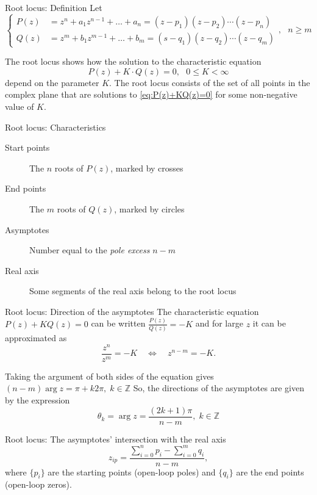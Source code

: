 \documentclass[presentation,aspectratio=169]{beamer}
\begin{document}
\begin{frame}[label={sec:orgdddade7}]{Root locus: Definition}
Let
\[\begin{cases} P(z)&=z^n+a_1z^{n-1}+\dots+a_n = (z-p_1)(z-p_2)\cdots(z-p_n)\\ 
Q(z)&=z^m+b_1 z^{m-1}+\dots+b_m=(s-q_1)(z-q_2)\cdots(z-q_m) \end{cases},\ \ \ n\ge m \]

\pause
The root locus shows how the \alert{solution} to the characteristic equation
\begin{equation}
\label{eq:P(z)+KQ(z)=0}
P(z)+K\cdot Q(z)=0,\ \ \ 0\le K<\infty
\end{equation}
depend on the parameter \(K\). The root locus consists of the set of all points in the complex plane that are solutions to \eqref{eq:P(z)+KQ(z)=0} for some non-negative value of \(K\).
\end{frame}

\begin{frame}[label={sec:org0f8aa4c}]{Root locus: Characteristics}
\begin{description}
\item[{Start points}] The \(n\) roots of \(P(z)\), marked by crosses
\item[{End points}] The \(m\) roots of \(Q(z)\), marked  by circles
\item[{Asymptotes}] Number equal to the \emph{pole excess} \(n-m\)
\item[{Real axis}] Some segments of the real axis belong to the root locus
\end{description}
\end{frame}

\begin{frame}[label={sec:org2402d6c}]{Root locus: Direction of the asymptotes}
The characteristic equation \(P(z)+K Q(z)=0\) can be written \(\frac{P(z)}{Q(z)} = -K\) and for large \(z\) it can be approximated as 
\[ \frac{z^n}{z^m} = -K \quad \Leftrightarrow \quad z^{n-m} = -K.\]

Taking the argument of both sides of the equation gives 
\((n-m)\arg z = \pi + k2\pi, \; k \in  \mathbb{Z}\)
So, the \alert{directions} of the asymptotes are given by the expression
\[ \theta_k = \arg z = \frac{(2k+1)\pi}{n-m}, \; k \in \mathbb{Z} \]
\end{frame}

\begin{frame}[label={sec:org7867159}]{Root locus: The asymptotes' intersection with the real axis}
\[ z_{ip} = \frac{ \sum_{i=0}^n p_i - \sum_{i=0}^m q_i}{n-m}, \]
where \(\{p_i\}\) are the starting points (open-loop poles) and \(\{q_i\}\) are the end points (open-loop zeros). 
\end{frame}
\end{document}
